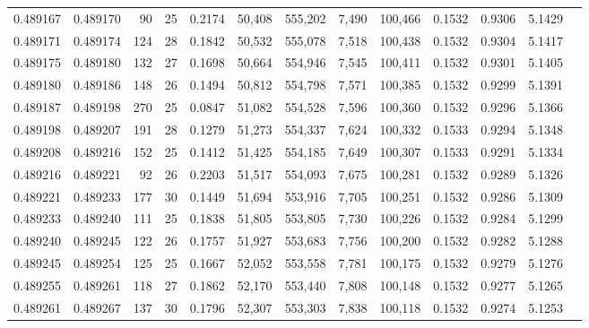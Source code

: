 \begin{tabular}{rrrrrrrrrrrrr}
0.489167 & 0.489170 &  90 &  25 &                                     0.2174 &  50,408 & 555,202 &   7,490 & 100,466 & 0.1532 & 0.9306 & 5.1429 \\
0.489171 & 0.489174 & 124 &  28 &                                     0.1842 &  50,532 & 555,078 &   7,518 & 100,438 & 0.1532 & 0.9304 & 5.1417 \\
0.489175 & 0.489180 & 132 &  27 &                                     0.1698 &  50,664 & 554,946 &   7,545 & 100,411 & 0.1532 & 0.9301 & 5.1405 \\
0.489180 & 0.489186 & 148 &  26 &                                     0.1494 &  50,812 & 554,798 &   7,571 & 100,385 & 0.1532 & 0.9299 & 5.1391 \\
0.489187 & 0.489198 & 270 &  25 &                                     0.0847 &  51,082 & 554,528 &   7,596 & 100,360 & 0.1532 & 0.9296 & 5.1366 \\
0.489198 & 0.489207 & 191 &  28 &                                     0.1279 &  51,273 & 554,337 &   7,624 & 100,332 & 0.1533 & 0.9294 & 5.1348 \\
0.489208 & 0.489216 & 152 &  25 &                                     0.1412 &  51,425 & 554,185 &   7,649 & 100,307 & 0.1533 & 0.9291 & 5.1334 \\
0.489216 & 0.489221 &  92 &  26 &                                     0.2203 &  51,517 & 554,093 &   7,675 & 100,281 & 0.1532 & 0.9289 & 5.1326 \\
0.489221 & 0.489233 & 177 &  30 &                                     0.1449 &  51,694 & 553,916 &   7,705 & 100,251 & 0.1532 & 0.9286 & 5.1309 \\
0.489233 & 0.489240 & 111 &  25 &                                     0.1838 &  51,805 & 553,805 &   7,730 & 100,226 & 0.1532 & 0.9284 & 5.1299 \\
0.489240 & 0.489245 & 122 &  26 &                                     0.1757 &  51,927 & 553,683 &   7,756 & 100,200 & 0.1532 & 0.9282 & 5.1288 \\
0.489245 & 0.489254 & 125 &  25 &                                     0.1667 &  52,052 & 553,558 &   7,781 & 100,175 & 0.1532 & 0.9279 & 5.1276 \\
0.489255 & 0.489261 & 118 &  27 &                                     0.1862 &  52,170 & 553,440 &   7,808 & 100,148 & 0.1532 & 0.9277 & 5.1265 \\
0.489261 & 0.489267 & 137 &  30 &                                     0.1796 &  52,307 & 553,303 &   7,838 & 100,118 & 0.1532 & 0.9274 & 5.1253 \\

\end{tabular}
